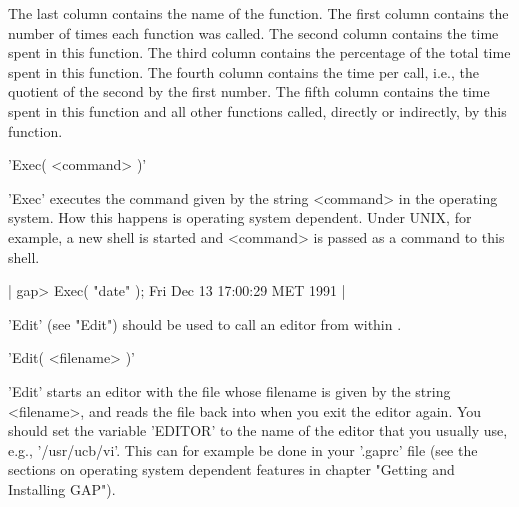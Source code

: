 The last  column contains the  name  of the function.   The  first column
contains the number of times each function was called.  The second column
contains the time spent in this function.  The third column  contains the
percentage of the total  time spent in this  function.  The fourth column
contains the time per call, i.e., the quotient of the second by the first
number.  The fifth column  contains the time  spent  in this function and
all other functions called, directly or indirectly, by this function.

%

'Exec( <command> )'

'Exec'  executes  the  command  given by  the  string <command>   in  the
operating system.  How this happens is operating system dependent.  Under
UNIX, for example, a new  shell is started  and <command>  is passed as a
command to this shell.

|    gap> Exec( "date" );
    Fri Dec 13 17:00:29 MET 1991 |

'Edit' (see "Edit") should be used to call an editor from within {\GAP}.

%

'Edit( <filename> )'

'Edit' starts an editor  with  the file  whose  filename is given by  the
string <filename>, and reads the file back into  {\GAP} when you exit the
editor again.  You should set the {\GAP} variable 'EDITOR' to the name of
the  editor  that you  usually use,  e.g.,  '/usr/ucb/vi'.   This can for
example  be done in   your '.gaprc' file  (see  the sections on operating
system dependent features in chapter "Getting and Installing GAP").

